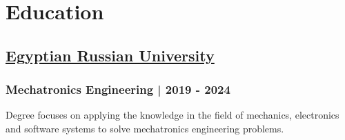 \section*{Education}
%
%
%
\subsection*{
	\href{https://www.eru.edu.eg/}{Egyptian Russian University}
}
\subsubsection*{Mechatronics Engineering | 2019 - 2024}
Degree focuses on applying the knowledge in the field of mechanics, electronics
and software systems to solve mechatronics engineering problems.